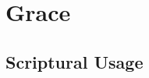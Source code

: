 \section{Grace}
	\label{GRACE}
	





\subsection{Scriptural Usage} %
	\label{GRACE-SCRIPTURES}

	
	
